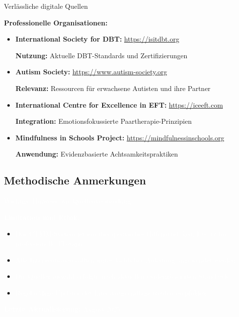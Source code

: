 \begin{ctmmPurpleBox}{Verlässliche digitale Quellen}

\textbf{Professionelle Organisationen:}
\begin{itemize}
  \item \textbf{International Society for DBT:} \url{https://isitdbt.org}

  \textbf{Nutzung:} Aktuelle DBT-Standards und Zertifizierungen

  \item \textbf{Autism Society:} \url{https://www.autism-society.org}

  \textbf{Relevanz:} Ressourcen für erwachsene Autisten und ihre Partner

  \item \textbf{International Centre for Excellence in EFT:} \url{https://iceeft.com}

  \textbf{Integration:} Emotionsfokussierte Paartherapie-Prinzipien

  \item \textbf{Mindfulness in Schools Project:} \url{https://mindfulnessinschools.org}

  \textbf{Anwendung:} Evidenzbasierte Achtsamkeitspraktiken
\end{itemize}

\end{ctmmPurpleBox}

\subsection{Methodische Anmerkungen}

\begin{ctmmRedBox}{\textcolor{white}{Wichtige Hinweise zur Quellenverwendung}}

\textcolor{white}{\textbf{Limitation und Ethik:}}

\begin{itemize}
  \item[\textcolor{white}{*}] \textcolor{white}{Das CTMM-System ist ein therapeutisches Hilfsmittel, kein Ersatz für professionelle Therapie}
  \item[\textcolor{white}{*}] \textcolor{white}{Alle Interventionen sollten unter fachlicher Anleitung angewendet werden}
  \item[\textcolor{white}{*}] \textcolor{white}{Die Quellenauswahl erfolgte nach aktuellen evidenzbasierten Standards}
  \item[\textcolor{white}{*}] \textcolor{white}{Regelmäßige Updates der Literaturgrundlage werden empfohlen}
\end{itemize}

\textcolor{white}{\textbf{Letzte Aktualisierung:} August 2025}

\end{ctmmRedBox}

